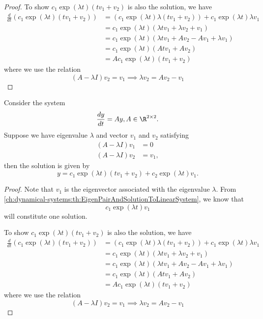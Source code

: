 \begin{refsection}
\begin{proof}
To show  $c_1\exp(\lambda t)(tv_1 + v_2)$ is also the solution, we have
\begin{align*}
\frac{d}{dt}(c_1\exp(\lambda t)(tv_1 + v_2)) &= (c_1\exp(\lambda t)\lambda(tv_1 + v_2)) + c_1\exp(\lambda t)\lambda v_1 \\
& = c_1\exp(\lambda t)(\lambda t v_1 + \lambda v_2 +  v_1 ) \\
& = c_1\exp(\lambda t)(\lambda t v_1 + Av_2 - Av_1 + \lambda v_1 ) \\
& = c_1\exp(\lambda t)(A t v_1 + Av_2) \\
& = Ac_1\exp(\lambda t)(t v_1 + v_2)
\end{align*}	
where we use the relation 
$$(A - \lambda I )v_2 = v_1 \implies \lambda v_2 = Av_2 - v_1$$
\end{proof}


\begin{theorem}
	Consider the system
	$$\frac{dy}{dt} = Ay, A\in\R^{2\times 2}.$$
	Suppose we have eigenvalue $\lambda$ and vector $v_1$ and $v_2$ satisfying
\begin{align*}
(A-\lambda I)v_1 &= 0 \\
(A-\lambda I)v_2 &= v_1, 
\end{align*}	
then the solution is given by
	$$y = c_1\exp(\lambda t)(tv_1 + v_2) + c_2\exp(\lambda t) v_1.$$	
\end{theorem}
\begin{proof}
	Note that $v_1$ is the eigenvector associated with the eigenvalue $\lambda$. From \autoref{ch:dynamical-systems:th:EigenPairAndSolutionToLinearSystem}, we know that
	$$c_1\exp(\lambda t) v_1$$ will constitute one solution.
	
	To show  $c_1\exp(\lambda t)(tv_1 + v_2)$ is also the solution, we have
	\begin{align*}
	\frac{d}{dt}(c_1\exp(\lambda t)(tv_1 + v_2)) &= (c_1\exp(\lambda t)\lambda(tv_1 + v_2)) + c_1\exp(\lambda t)\lambda v_1 \\
	& = c_1\exp(\lambda t)(\lambda t v_1 + \lambda v_2 +  v_1 ) \\
	& = c_1\exp(\lambda t)(\lambda t v_1 + Av_2 - Av_1 + \lambda v_1 ) \\
	& = c_1\exp(\lambda t)(A t v_1 + Av_2) \\
	& = Ac_1\exp(\lambda t)(t v_1 + v_2)
	\end{align*}	
	where we use the relation 
	$$(A - \lambda I )v_2 = v_1 \implies \lambda v_2 = Av_2 - v_1$$
\end{proof}


\end{refsection}
